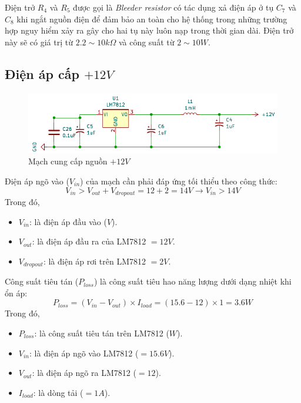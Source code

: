Điện trở $R_{4}$ và $R_{5}$ được gọi là \textit{Bleeder resistor} có tác dụng xả điện áp ở tụ $C_{7}$ và $C_{8}$ khi ngắt nguồn điện để đảm bảo an toàn cho hệ thống trong những trường hợp nguy hiểm xảy ra gây cho hai tụ này luôn nạp trong thời gian dài. Điện trở này sẽ có giá trị từ $2.2 \sim 10k\Omega$ và công suất từ $2 \sim 10W$.

\subsection{Điện áp cấp $+12V$}

\begin{figure}[H]
	\centering
	\includegraphics[width=0.6\linewidth]{./picture/supply_+12V.pdf}
	\caption{Mạch cung cấp nguồn $+12V$}
	\label{f_powersupply_+12V}
\end{figure}

Điện áp ngõ vào ($V_{in}$) của mạch cần phải đáp ứng tối thiểu theo công thức: \[ V_{in} > V_{out} + V_{dropout} = 12 + 2 = 14V \rightarrow V_{in} > 14V\]
Trong đó,
\begin{itemize}[label = -]
	\item $V_{in}$: là điện áp đầu vào ($V$).
	\item $V_{out}$: là điện áp đầu ra của LM7812 $=12V$.
	\item $V_{dropout}$: là điện áp rơi trên LM7812 $=2V$.
\end{itemize}

Công suất tiêu tán ($P_{loss}$) là công suất tiêu hao năng lượng dưới dạng nhiệt khi ổn áp: \[ P_{loss} = (V_{in} - V_{out}) \times I_{load} = (15.6 - 12)\times 1 = 3.6W\]
Trong đó,
\begin{itemize}[label=-]
	\item $P_{loss}$: là công suất tiêu tán trên LM7812 ($W$).
	\item $V_{in}$: là điện áp ngõ vào LM7812 ($=15.6V$).
	\item $V_{out}$: là điện áp ngõ ra LM7812 ($=12$).
	\item $I_{load}$: là dòng tải ($=1A$).
\end{itemize}

